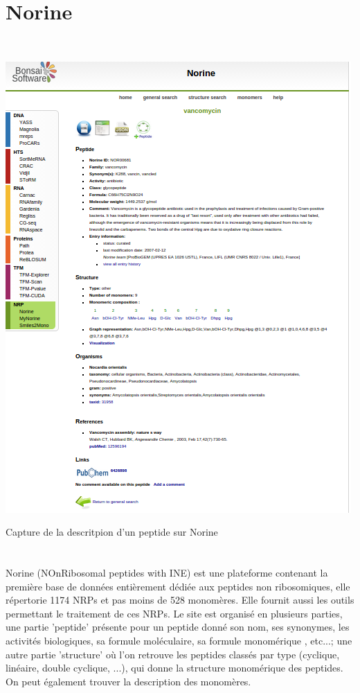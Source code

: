 \documentclass[a4paper,10pt]{report}
\begin{document}
      \section{Norine}
	 ~\\
	 \begin{minipage}[c]{\textwidth}
	    \centering
	     \includegraphics[scale =0.7]{image/Norine.png}
	      \caption{Capture de la descritpion d'un peptide sur Norine}
	 \end{minipage}
	 
	  \paragraph{}

	  \\Norine (NOnRibosomal peptides with INE) est une plateforme contenant la première base de données entièrement dédiée aux peptides non ribosomiques, elle répertorie 1174 NRPs et pas moins de 528 monomères. Elle fournit aussi les outils permettant le traitement de ces NRPs. 
	  Le site est organisé en plusieurs parties, une partie 'peptide' présente pour un peptide donné son nom, ses synonymes, les activités biologiques, sa formule moléculaire, sa formule monomérique , etc...; une autre partie 'structure' où l'on retrouve les peptides classés par type (cyclique, linéaire, double cyclique, ...), qui donne la structure monomérique des peptides.
	  On peut également trouver la description des monomères. 
	
\end{document}
